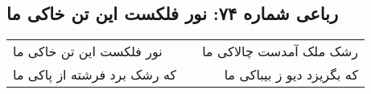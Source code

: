 \begin{center}
\section*{رباعی شماره ۷۴: نور فلکست این تن خاکی ما}
\label{sec:0074}
\begin{longtable}{l p{0.5cm} r}
نور فلکست این تن خاکی ما
&&
رشک ملک آمدست چالاکی ما
\\
که رشک برد فرشته از پاکی ما
&&
که بگریزد دیو ز بیباکی ما
\\
\end{longtable}
\end{center}
